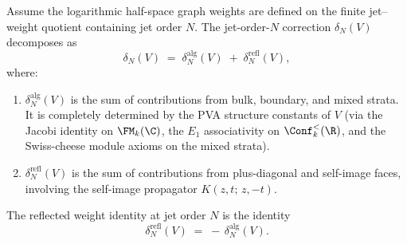 \begin{theorem}
\label{thm:jacobi-reflection-decomposition}
Assume the logarithmic half-space graph weights are defined on the finite jet--weight quotient containing
jet order $N$. The jet-order-$N$ correction $\delta_N(V)$ decomposes as
\begin{equation}\label{eq:jacobi-reflection-decomposition}
\delta_N(V) \;=\; \delta_N^{\mathrm{alg}}(V)
\;+\; \delta_N^{\mathrm{refl}}(V),
\end{equation}
where:
\begin{enumerate}
\item $\delta_N^{\mathrm{alg}}(V)$ is the sum of contributions from
 bulk, boundary, and mixed strata. It is completely determined by the
 PVA structure constants of $V$ (via the Jacobi identity on
 $\FM_k(\C)$, the $E_1$ associativity on $\Conf_k^{<}(\R)$, and the
 Swiss-cheese module axioms on the mixed strata).
\item $\delta_N^{\mathrm{refl}}(V)$ is the sum of contributions from
 plus-diagonal and self-image faces, involving the self-image propagator
 $K(z,t;\,z,-t)$.
\end{enumerate}
The reflected weight identity at jet order $N$ is the identity
\begin{equation}\label{eq:refl-equals-alg}
\delta_N^{\mathrm{refl}}(V) \;=\; -\,\delta_N^{\mathrm{alg}}(V).
\end{equation}
\end{theorem}

